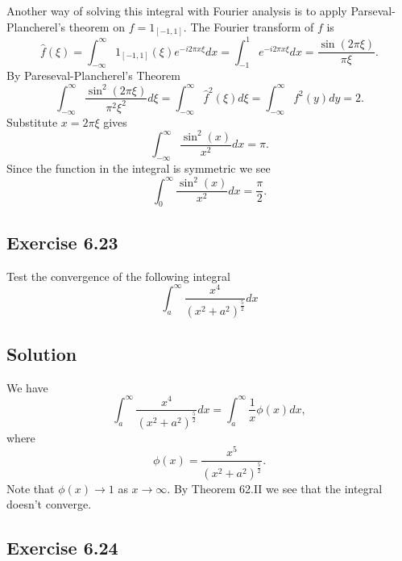 Another way of solving this integral with Fourier analysis is to apply Parseval-Plancherel's theorem on $f = 1_{[-1, 1]}$.
The Fourier transform of $f$ is
\begin{equation*}
    \hat{f}(\xi) = \int_{-\infty}^{\infty} 1_{[-1, 1]}(\xi) e^{-i 2 \pi x \xi} dx
        = \int_{-1}^{1} e^{-i 2 \pi x \xi} dx
        = \frac{\sin(2 \pi \xi)}{\pi \xi}.
\end{equation*}
By Pareseval-Plancherel's Theorem
\begin{equation*}
    \int_{-\infty}^{\infty} \frac{\sin^2(2 \pi \xi)}{\pi^2 \xi^2} d\xi
        = \int_{-\infty}^{\infty} \hat{f}^2(\xi) d\xi
        = \int_{-\infty}^{\infty} f^2(y) dy
        = 2.
\end{equation*}
Substitute $x = 2 \pi \xi$ gives
\begin{equation*}
    \int_{-\infty}^{\infty} \frac{\sin^2(x)}{x^2} dx = \pi.
\end{equation*}
Since the function in the integral is symmetric we see
\begin{equation*}
    \int_0^{\infty} \frac{\sin^2(x)}{x^2} dx = \frac{\pi}{2}.
\end{equation*}


\subsection*{Exercise 6.23}

Test the convergence of the following integral
\begin{equation*}
    \int_a^{\infty} \frac{x^4}{(x^2 + a^2)^{\frac{5}{2}}} dx
\end{equation*}

\subsection*{Solution}

We have
\begin{equation*}
    \int_a^{\infty} \frac{x^4}{(x^2 + a^2)^{\frac{5}{2}}} dx
        = \int_a^{\infty} \frac{1}{x} \phi(x) dx,
\end{equation*}
where
\begin{equation*}
    \phi(x) = \frac{x^5}{(x^2 + a^2)^{\frac{5}{2}}}.
\end{equation*}
Note that $\phi(x) \to 1$ as $x \to \infty$.
By Theorem 62.II we see that the integral doesn't converge.


\subsection*{Exercise 6.24}


